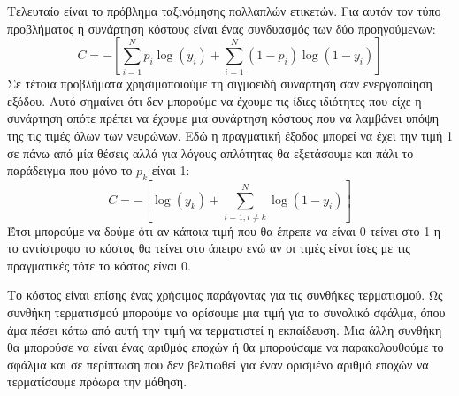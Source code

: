 Τελευταίο είναι το πρόβλημα ταξινόμησης πολλαπλών ετικετών. Για αυτόν τον τύπο προβλήματος η συνάρτηση κόστους είναι ένας συνδυασμός των δύο προηγούμενων:
$$C=-\left[\sum\limits_{i=1}^Np_i\log (y_i) +\sum\limits_{i=1}^N(1-p_i)\log (1-y_i)\right]$$
Σε τέτοια προβλήματα χρησιμοποιούμε τη σιγμοειδή συνάρτηση σαν ενεργοποίηση εξόδου. Αυτό σημαίνει ότι δεν μπορούμε να έχουμε τις ίδιες ιδιότητες που είχε η συνάρτηση  οπότε πρέπει να έχουμε μια συνάρτηση κόστους που να λαμβάνει
υπόψη της τις τιμές όλων των νευρώνων. Εδώ η πραγματική έξοδος μπορεί να έχει την τιμή 1 σε πάνω από μία θέσεις αλλά για λόγους απλότητας θα εξετάσουμε και πάλι το παράδειγμα που μόνο το $p_k$ είναι 1:
$$C=-\left[\log (y_k) +\sum\limits_{i=1,i\neq k}^N\log (1-y_i)\right]$$
Έτσι μπορούμε να δούμε ότι αν κάποια τιμή που θα έπρεπε να είναι 0 τείνει στο 1 η το αντίστροφο το κόστος θα τείνει στο άπειρο ενώ αν οι τιμές είναι ίσες με τις πραγματικές τότε το κόστος είναι 0.

Το κόστος είναι επίσης ένας χρήσιμος παράγοντας για τις συνθήκες τερματισμού.
Ως συνθήκη τερματισμού μπορούμε να ορίσουμε μια τιμή για το συνολικό σφάλμα, όπου
άμα πέσει κάτω από αυτή την τιμή να τερματιστεί η εκπαίδευση. Μια άλλη συνθήκη θα
μπορούσε να είναι ένας αριθμός εποχών ή θα μπορούσαμε να παρακολουθούμε το σφάλμα
και σε περίπτωση που δεν βελτιωθεί για έναν ορισμένο αριθμό εποχών να τερματίσουμε
πρόωρα την μάθηση.